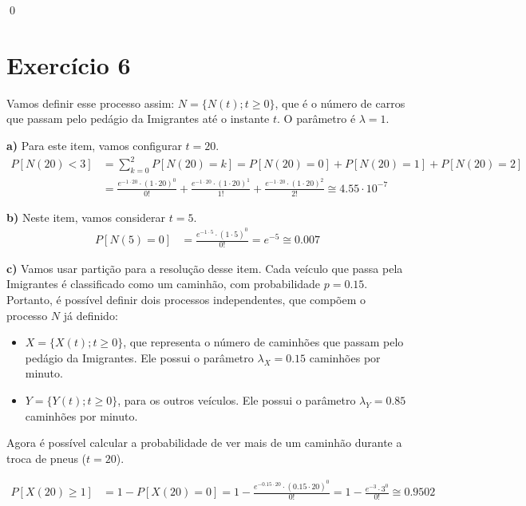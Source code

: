 \documentclass[12pt]{article}
\begin{document}
	 \qed
	 
	 \section*{Exercício 6}
	 
	 Vamos definir esse processo assim: $ N = \{N(t); t\geq0\} $, que é o número de carros que passam pelo pedágio da Imigrantes até o instante $ t $. O parâmetro é $ \lambda = 1 $.
	 
	 \textbf{a)} Para este item, vamos configurar $ t = 20 $.
	 \begin{equation*}
	 	\begin{split}
		 	P[N(20) < 3] & = \sum_{k=0}^{2} P[N(20) = k] = P[N(20) = 0] + P[N(20) = 1] + P[N(20) = 2] \\
		 	& = \frac{e^{-1\cdot 20}\cdot(1\cdot 20)^0}{0!} + \frac{e^{-1\cdot 20}\cdot(1\cdot 20)^1}{1!} + \frac{e^{-1\cdot 20}\cdot(1\cdot 20)^2}{2!} \cong 4.55 \cdot 10^{-7}
	 	\end{split}
	 \end{equation*}
	 
	 \textbf{b)} Neste item, vamos considerar $ t = 5 $.
	 \begin{equation*}
		 \begin{split}
			 P[N(5) = 0] & = \frac{e^{-1\cdot 5}\cdot(1\cdot 5)^0}{0!} = e^{-5} \cong 0.007
		 \end{split}
	 \end{equation*}
	 
	 \textbf{c)} Vamos usar partição para a resolução desse item. Cada veículo que passa pela Imigrantes é classificado como um caminhão, com probabilidade $ p = 0.15 $. Portanto, é possível definir dois processos independentes, que compõem o processo $ N $ já definido:
	 
	 \begin{itemize}
	 	\item $ X = \{X(t); t\geq0\} $, que representa o número de caminhões que passam pelo pedágio da Imigrantes. Ele possui o parâmetro $\lambda_X = 0.15$ caminhões por minuto.
	 	\item $ Y = \{Y(t); t\geq0\} $, para os outros veículos. Ele possui o parâmetro $\lambda_Y = 0.85$ caminhões por minuto.
	 \end{itemize}
	 
	 Agora é possível calcular a probabilidade de ver mais de um caminhão durante a troca de pneus ($ t = 20 $).
	 
	 \begin{equation*}
		 \begin{split}
			 P[X(20) \geq 1] & = 1 - P[X(20) = 0] = 1 - \frac{e^{-0.15\cdot 20}\cdot(0.15\cdot 20)^0}{0!} = 1 - \frac{e^{-3}\cdot 3^0}{0!} \cong 0.9502
		 \end{split}
	 \end{equation*}
	 
\end{document}
